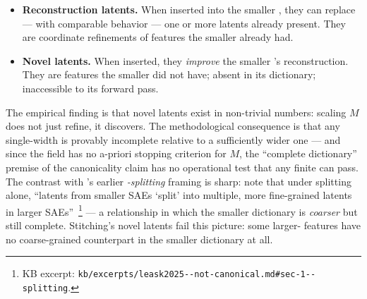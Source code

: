 \begin{itemize}
  \item \textbf{Reconstruction latents.} When inserted into the
    smaller , they can replace --- with comparable behavior ---
    one or more latents already present. They are coordinate
    refinements of features the smaller  already had.
  \item \textbf{Novel latents.} When inserted, they
    \emph{improve} the smaller 's reconstruction. They are
    features the smaller  did not have; absent in its dictionary;
    inaccessible to its forward pass.
\end{itemize}

\noindent The empirical finding is that novel latents exist in
non-trivial numbers: scaling $M$ does not just refine, it discovers.
The methodological consequence
\citep[\S 1]{leask2025-sae-not-canonical} is that any single-width 
is provably incomplete relative to a sufficiently wider one --- and
since the field has no a-priori stopping criterion for $M$, the
``complete dictionary'' premise of the canonicality claim has no
operational test that any finite  can pass. The contrast with
\citet{bricken2023-monosemanticity}'s earlier \emph{-splitting}
framing is sharp:
\citeauthor{leask2025-sae-not-canonical} note that under 
splitting alone, ``latents from smaller SAEs `split' into multiple,
more fine-grained latents in larger
SAEs''~\citep[\S 1]{leask2025-sae-not-canonical}\footnote{KB excerpt:
\texttt{kb/excerpts/leask2025--not-canonical.md\#sec-1--splitting}.}
--- a relationship in which the smaller dictionary is \emph{coarser}
but still complete. Stitching's novel latents fail this picture: some
larger- features have no coarse-grained counterpart in the smaller
dictionary at all.

